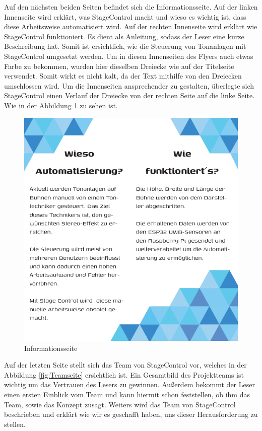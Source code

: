 Auf den nächsten beiden Seiten befindet sich die Informationsseite. Auf der linken Innenseite wird erklärt, was StageControl macht und wieso es wichtig ist, dass diese Arbeitsweise automatisiert wird. Auf der rechten Innenseite wird erklärt wie StageControl funktioniert. Es dient als Anleitung, sodass der Leser eine kurze Beschreibung hat. Somit ist ersichtlich, wie die Steuerung von Tonanlagen mit StageControl umgesetzt werden. Um in diesen Innenseiten des Flyers auch etwas Farbe zu bekommen, wurden hier dieselben Dreiecke wie auf der Titelseite verwendet. Somit wirkt es nicht kalt, da der Text mithilfe von den Dreiecken umschlossen wird. Um die Innenseiten ansprechender zu gestalten, überlegte sich StageControl einen Verlauf der Dreiecke von der rechten Seite auf die linke Seite. Wie in der Abbildung \ref{fig:Informationsseite} zu sehen ist.

\begin{figure}[H]
	\centering
	\includegraphics[width=0.5\linewidth]{images/Informationsseite.png}
	\caption[Informationsseite]{Informationsseite}
	\label{fig:Informationsseite}
\end{figure} 

Auf der letzten Seite stellt sich das Team von StageControl vor, welches in der Abbildung \ref{fig:Teamseite} ersichtlich ist. Ein Gesamtbild des Projektteams ist wichtig um das Vertrauen des Lesers zu gewinnen. Außerdem bekommt der Leser einen ersten Einblick vom Team und kann hiermit schon feststellen, ob ihm das Team, sowie das Konzept zusagt. Weiters wird das Team von StageControl beschrieben und erklärt wie wir es geschafft haben, uns dieser Herausforderung zu stellen.

